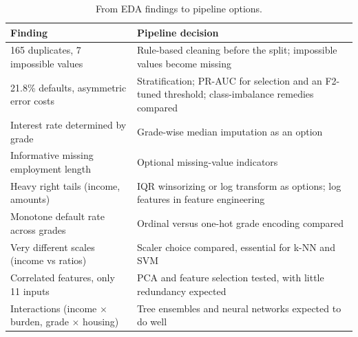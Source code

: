 \begin{table}[H]
  \centering
  \small
  \begin{tabularx}{\linewidth}{XX}
    \toprule
    \textbf{Finding} & \textbf{Pipeline decision} \\
    \midrule
    165 duplicates, 7 impossible values & Rule-based cleaning before the split; impossible values become missing \\
    21.8\% defaults, asymmetric error costs & Stratification; PR-AUC for selection and an F2-tuned threshold; class-imbalance remedies compared \\
    Interest rate determined by grade & Grade-wise median imputation as an option \\
    Informative missing employment length & Optional missing-value indicators \\
    Heavy right tails (income, amounts) & IQR winsorizing or log transform as options; log features in feature engineering \\
    Monotone default rate across grades & Ordinal versus one-hot grade encoding compared \\
    Very different scales (income vs ratios) & Scaler choice compared, essential for k-NN and SVM \\
    Correlated features, only 11 inputs & PCA and feature selection tested, with little redundancy expected \\
    Interactions (income $\times$ burden, grade $\times$ housing) & Tree ensembles and neural networks expected to do well \\
    \bottomrule
  \end{tabularx}
  \caption{From EDA findings to pipeline options.}
  \label{tab:eda_decisions}
\end{table}
